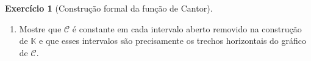 \documentclass[12pt,portuguese]{article}
\theoremstyle{definition}
\theoremstyle{plainexercise}
\theoremstyle{starredexercise}
\newtheorem{starredexercise}[exercise]{Exercício}
\theoremstyle{definition}
\begin{document}
\begin{starredexercise}[Construção formal da função de Cantor]
\begin{enumerate}[label=\alph*)]
  \item Mostre que $\mathcal{C}$ é constante em cada intervalo aberto removido
  na construção de $\mathbb{K}$ e que esses intervalos são precisamente os
  trechos horizontais do gráfico de $\mathcal{C}$.
\end{enumerate}
\end{starredexercise}



\end{document}
